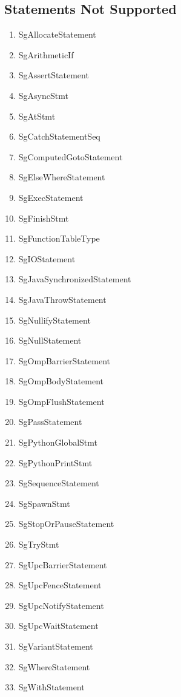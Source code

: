 \documentclass[11pt]{article}
\begin{document}
{\begin{enumeration}
\subsection{Statements Not Supported}
\begin{enumerate}
\item SgAllocateStatement
\item SgArithmeticIf
\item SgAssertStatement
\item SgAsyncStmt
\item SgAtStmt
\item SgCatchStatementSeq
\item SgComputedGotoStatement
\item SgElseWhereStatement
\item SgExecStatement
\item SgFinishStmt
\item SgFunctionTableType
\item SgIOStatement
\item SgJavaSynchronizedStatement
\item SgJavaThrowStatement
\item SgNullifyStatement
\item SgNullStatement
\item SgOmpBarrierStatement
\item SgOmpBodyStatement
\item SgOmpFlushStatement
\item SgPassStatement
\item SgPythonGlobalStmt
\item SgPythonPrintStmt
\item SgSequenceStatement
\item SgSpawnStmt
\item SgStopOrPauseStatement
\item SgTryStmt
\item SgUpcBarrierStatement
\item SgUpcFenceStatement
\item SgUpcNotifyStatement
\item SgUpcWaitStatement
\item SgVariantStatement
\item SgWhereStatement
\item SgWithStatement
\end{enumerate}


\end{enumeration}}
\end{document}
